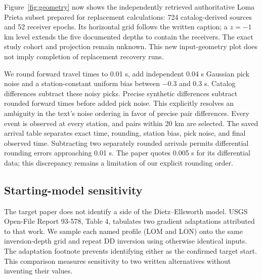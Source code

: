\documentclass[11pt]{article}
\begin{document}
Figure~\ref{fig:geometry} now shows the independently retrieved authoritative
Loma Prieta subset prepared for replacement calculations: 724 catalog-derived
sources and 52 receiver epochs. Its horizontal grid follows the written
caption; a $z=-1$ km level extends the five documented depths to contain the
receivers. The exact study cohort and projection remain unknown. This new
input-geometry plot does not imply completion of replacement recovery runs.

We round forward travel times to 0.01 s, add independent 0.04 s Gaussian
pick noise and a station-constant uniform bias between $-0.3$ and $0.3$ s.
Catalog differences subtract these noisy picks. Precise synthetic differences
subtract rounded forward times before added pick noise. This explicitly
resolves an ambiguity in the text's noise ordering in favor of precise
pair differences. Every event is observed at every station, and pairs within
20 km are selected. The saved arrival table separates exact time, rounding,
station bias, pick noise, and final observed time.
Subtracting two separately rounded arrivals permits differential rounding
errors approaching 0.01 s. The paper quotes 0.005 s for its differential
data; this discrepancy remains a limitation of our explicit rounding order.

\subsection{Starting-model sensitivity}
The target paper does not identify a side of the Dietz--Ellsworth model.
USGS Open-File Report 93-578, Table 4, tabulates two gradient adaptations
attributed to that work. We sample each named profile (LOM and LON) onto
the same inversion-depth grid and repeat DD inversion using otherwise
identical inputs. The adaptation footnote prevents identifying either as
the confirmed target start. This comparison measures sensitivity to two
written alternatives without inventing their values.
\begin{table}[htbp]\centering\small

\caption{Starting-model sensitivity of the independent DD experiment.
LOM and LON are written gradient adaptations in USGS OFR 93-578.
All runs share geometry, true velocity, and observation noise. Median
three-dimensional location errors are in km, mean absolute velocity errors
are in km/s, and arrival residual RMS values are in s. The first velocity
column uses all saved slices; the interior column restricts $x$ to
$[-15,20]$ km, $y$ to $[-40,20]$ km, and depths to 3--11 km.}
\end{table}
\end{document}
